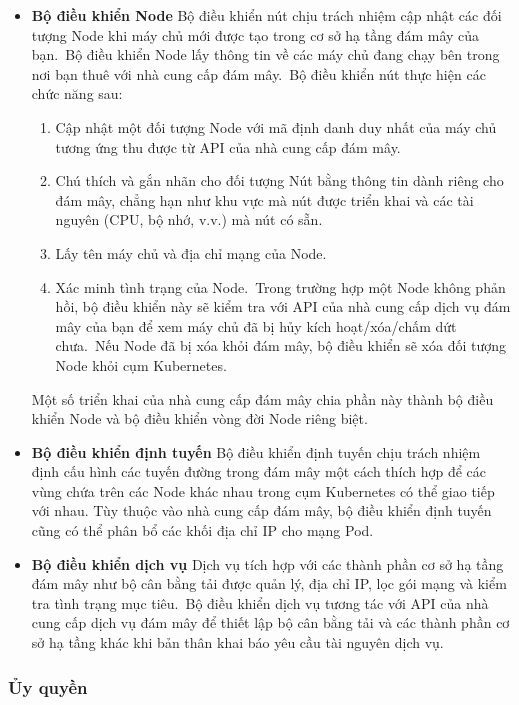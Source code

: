\documentclass[12pt,a4paper]{report}
\begin{document}
	\begin{itemize}
		\item \textbf{Bộ điều khiển Node}
		\smallskip
		\subitem Bộ điều khiển nút chịu trách nhiệm cập nhật các đối tượng Node khi máy chủ mới được tạo trong cơ sở hạ tầng đám mây của bạn. Bộ điều khiển Node lấy thông tin về các máy chủ đang chạy bên trong nơi bạn thuê với nhà cung cấp đám mây. Bộ điều khiển nút thực hiện các chức năng sau:
		\begin{enumerate}
			\item Cập nhật một đối tượng Node với mã định danh duy nhất của máy chủ tương ứng thu được từ API của nhà cung cấp đám mây.
			\item Chú thích và gắn nhãn cho đối tượng Nút bằng thông tin dành riêng cho đám mây, chẳng hạn như khu vực mà nút được triển khai và các tài nguyên (CPU, bộ nhớ, v.v.) mà nút có sẵn.
			\item Lấy tên máy chủ và địa chỉ mạng của Node.
			\item Xác minh tình trạng của Node. Trong trường hợp một Node không phản hồi, bộ điều khiển này sẽ kiểm tra với API của nhà cung cấp dịch vụ đám mây của bạn để xem máy chủ đã bị hủy kích hoạt/xóa/chấm dứt chưa. Nếu Node đã bị xóa khỏi đám mây, bộ điều khiển sẽ xóa đối tượng Node khỏi cụm Kubernetes.
		\end{enumerate}
		\smallskip
		\subitem Một số triển khai của nhà cung cấp đám mây chia phần này thành bộ điều khiển Node và bộ điều khiển vòng đời Node riêng biệt.
		\smallskip
		\item \textbf{Bộ điều khiển định tuyến}
		\smallskip
		\subitem Bộ điều khiển định tuyến chịu trách nhiệm định cấu hình các tuyến đường trong đám mây một cách thích hợp để các vùng chứa trên các Node khác nhau trong cụm Kubernetes có thể giao tiếp với nhau.
		\smallskip
		\subitem Tùy thuộc vào nhà cung cấp đám mây, bộ điều khiển định tuyến cũng có thể phân bổ các khối địa chỉ IP cho mạng Pod.
		\smallskip
		\item \textbf{Bộ điều khiển dịch vụ}
		\smallskip
		\subitem Dịch vụ tích hợp với các thành phần cơ sở hạ tầng đám mây như bộ cân bằng tải được quản lý, địa chỉ IP, lọc gói mạng và kiểm tra tình trạng mục tiêu. Bộ điều khiển dịch vụ tương tác với API của nhà cung cấp dịch vụ đám mây để thiết lập bộ cân bằng tải và các thành phần cơ sở hạ tầng khác khi bản thân khai báo yêu cầu tài nguyên dịch vụ.
	\end{itemize}
	
	\subsubsection{Ủy quyền}
	
\end{document}
